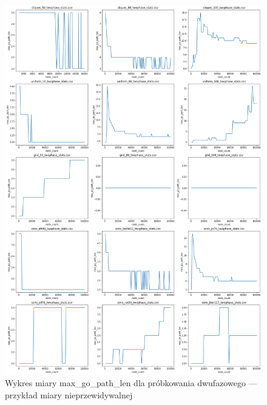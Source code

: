 \begin{figure}[]
    \centering
    \includegraphics[width=\textwidth]{chapters/experiments/img/merged_plots/main_twophase/max_go_path_len.png}
    \caption{Wykres miary max\_go\_path\_len dla próbkowania dwufazowego --- przykład miary nieprzewidywalnej}
    \label{fig:included_max_go_path_len}
\end{figure}

